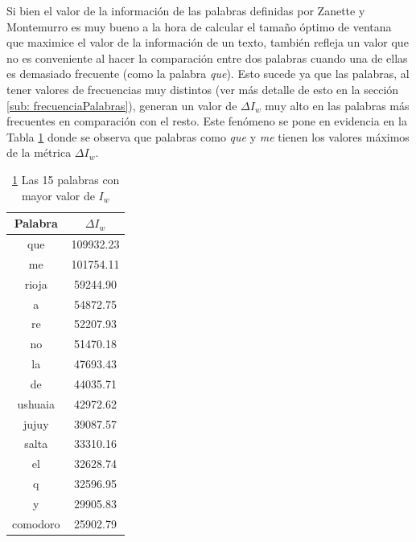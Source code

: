 Si bien el valor de la información de las palabras definidas por Zanette y Montemurro es muy bueno a la hora de calcular el tamaño óptimo de ventana que maximice el valor de la información de un texto, también refleja un valor que no es conveniente al hacer la comparación entre dos palabras cuando una de ellas es demasiado frecuente (como la palabra \textit{que}). Esto sucede ya que las palabras, al tener valores de frecuencias muy distintos (ver más detalle de esto en la sección \ref{sub: frecuenciaPalabras}), generan un valor de $\Delta I_w$ muy alto en las palabras más frecuentes en comparación con el resto. Este fenómeno se pone en evidencia en la Tabla \ref{tab:zanette} donde se observa que palabras como \textit{que} y \textit{me} tienen los valores máximos de la métrica $\Delta I_w$.



\begin{table}[h]
\centering

\begin{tabular}{ c c }
\toprule
Palabra  & $\Delta I_w$                      \\
\midrule
que      & 109932.23                         \\
me       & 101754.11                        \\
rioja    & 59244.90                          \\
a        & 54872.75                          \\
re       & 52207.93                          \\
no       & 51470.18                          \\
la       & 47693.43                          \\
de       & 44035.71                          \\
ushuaia  & 42972.62                          \\
jujuy    & 39087.57                          \\
salta    & 33310.16                          \\
el       & 32628.74                          \\
q        & 32596.95                          \\
y        & 29905.83                          \\
comodoro & 25902.79                         \\
\bottomrule
\end{tabular}
\caption{\ref{tab:zanette} Las 15 palabras con mayor valor de $I_w$ }
\label{tab:zanette}
\end{table}

